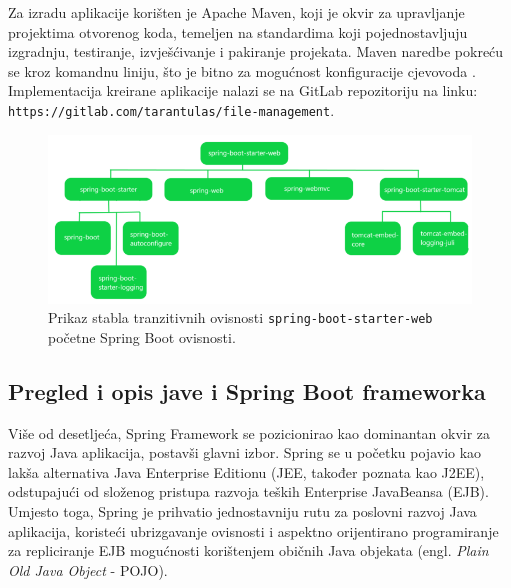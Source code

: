\documentclass[a4paper,12pt,oneside]{article}
\begin{document}
 Za izradu aplikacije korišten je Apache Maven, koji je okvir za upravljanje projektima otvorenog koda, temeljen na standardima koji pojednostavljuju izgradnju, testiranje, izvješćivanje i pakiranje projekata. Maven naredbe pokreću se kroz komandnu liniju, što je bitno za mogućnost konfiguracije cjevovoda \cite{springBootInAction}. Implementacija kreirane aplikacije nalazi se na GitLab repozitoriju na linku: \texttt{https://gitlab.com/tarantulas/file-management}.

\begin{figure}
    \centering
    \includegraphics[width=1\linewidth]{Slike/spring-boot-starter-web.png}
    \caption{Prikaz stabla tranzitivnih ovisnosti \texttt{spring-boot-starter-web} početne Spring Boot ovisnosti. \cite{spring-boot-starter}}
    \label{fig:spring-boot-starter-web}
\end{figure}

\subsection{Pregled i opis jave i Spring Boot frameworka}

Više od desetljeća, Spring Framework se pozicionirao kao dominantan okvir za razvoj Java aplikacija, postavši glavni izbor. Spring se u početku pojavio kao lakša alternativa Java Enterprise Editionu (JEE, također poznata kao J2EE), odstupajući od složenog pristupa razvoja teških Enterprise JavaBeansa (EJB). Umjesto toga, Spring je prihvatio jednostavniju rutu za poslovni razvoj Java aplikacija, koristeći ubrizgavanje ovisnosti i aspektno orijentirano programiranje za repliciranje EJB mogućnosti korištenjem običnih Java objekata (engl. \textit{Plain Old Java Object} - POJO).
\end{document}

